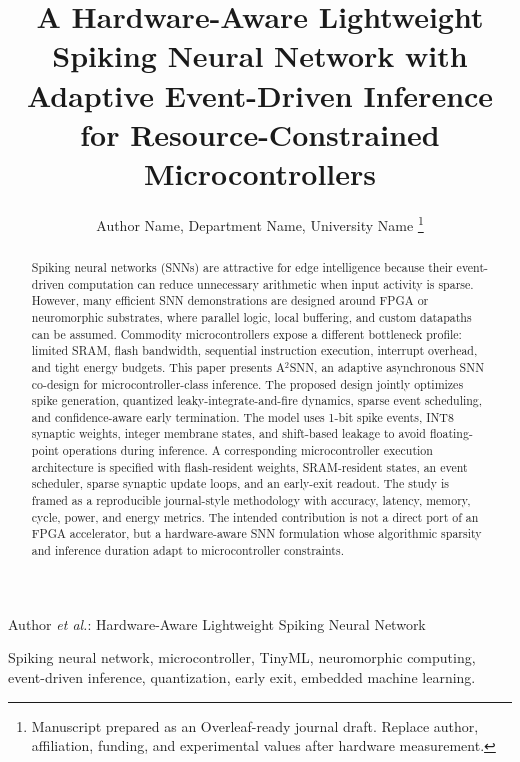 \documentclass[journal]{IEEEtran}
\newcommand{\modelname}{A$^2$SNN}
\begin{document}
\title{A Hardware-Aware Lightweight Spiking Neural Network with Adaptive Event-Driven Inference for Resource-Constrained Microcontrollers}

\author{Author Name,
        Department Name,
        University Name%
\thanks{Manuscript prepared as an Overleaf-ready journal draft. Replace author, affiliation, funding, and experimental values after hardware measurement.}}

%
{Author \MakeLowercase{\textit{et al.}}: Hardware-Aware Lightweight Spiking Neural Network}

\maketitle

\begin{abstract}
Spiking neural networks (SNNs) are attractive for edge intelligence because their event-driven computation can reduce unnecessary arithmetic when input activity is sparse. However, many efficient SNN demonstrations are designed around FPGA or neuromorphic substrates, where parallel logic, local buffering, and custom datapaths can be assumed. Commodity microcontrollers expose a different bottleneck profile: limited SRAM, flash bandwidth, sequential instruction execution, interrupt overhead, and tight energy budgets. This paper presents \modelname, an adaptive asynchronous SNN co-design for microcontroller-class inference. The proposed design jointly optimizes spike generation, quantized leaky-integrate-and-fire dynamics, sparse event scheduling, and confidence-aware early termination. The model uses 1-bit spike events, INT8 synaptic weights, integer membrane states, and shift-based leakage to avoid floating-point operations during inference. A corresponding microcontroller execution architecture is specified with flash-resident weights, SRAM-resident states, an event scheduler, sparse synaptic update loops, and an early-exit readout. The study is framed as a reproducible journal-style methodology with accuracy, latency, memory, cycle, power, and energy metrics. The intended contribution is not a direct port of an FPGA accelerator, but a hardware-aware SNN formulation whose algorithmic sparsity and inference duration adapt to microcontroller constraints.
\end{abstract}

\begin{IEEEkeywords}
Spiking neural network, microcontroller, TinyML, neuromorphic computing, event-driven inference, quantization, early exit, embedded machine learning.
\end{IEEEkeywords}
\end{document}
